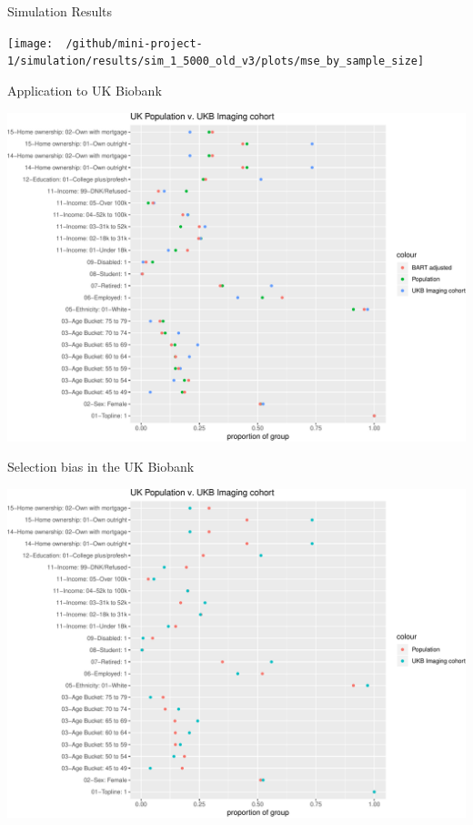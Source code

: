 \documentclass[
  ignorenonframetext,
]{beamer}
\begin{document}
\begin{frame}{Simulation Results}
\protect\hypertarget{simulation-results}{}

\center

\texttt{[image: ~/github/mini-project-1/simulation/results/sim\_1\_5000\_old\_v3/plots/mse\_by\_sample\_size]}

\end{frame}

\begin{frame}{Application to UK Biobank}
\protect\hypertarget{application-to-uk-biobank}{}

\includegraphics{fmrib-deck-20191002_files/figure-beamer/fig-ukb-results-1.pdf}

\end{frame}

\begin{frame}{Selection bias in the UK Biobank}
\protect\hypertarget{selection-bias-in-the-uk-biobank-2}{}

\includegraphics{fmrib-deck-20191002_files/figure-beamer/fig-1-1.pdf}

\end{frame}
\end{document}
